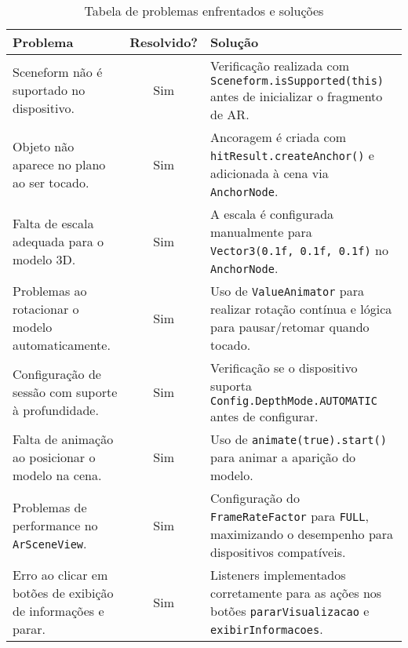 \documentclass[12pt]{article}
\begin{document}
\begin{table}[h!]
\centering
\begin{tabular}{|p{6cm}|c|p{6cm}|}
\hline
\textbf{Problema} & \textbf{Resolvido?} & \textbf{Solução} \\ \hline
Sceneform não é suportado no dispositivo. & Sim & Verificação realizada com \texttt{Sceneform.isSupported(this)} antes de inicializar o fragmento de AR. \\ \hline
Objeto não aparece no plano ao ser tocado. & Sim & Ancoragem é criada com \texttt{hitResult.createAnchor()} e adicionada à cena via \texttt{AnchorNode}. \\ \hline
Falta de escala adequada para o modelo 3D. & Sim & A escala é configurada manualmente para \texttt{Vector3(0.1f, 0.1f, 0.1f)} no \texttt{AnchorNode}. \\ \hline
Problemas ao rotacionar o modelo automaticamente. & Sim & Uso de \texttt{ValueAnimator} para realizar rotação contínua e lógica para pausar/retomar quando tocado. \\ \hline
Configuração de sessão com suporte à profundidade. & Sim & Verificação se o dispositivo suporta \texttt{Config.DepthMode.AUTOMATIC} antes de configurar. \\ \hline
Falta de animação ao posicionar o modelo na cena. & Sim & Uso de \texttt{animate(true).start()} para animar a aparição do modelo. \\ \hline
Problemas de performance no \texttt{ArSceneView}. & Sim & Configuração do \texttt{FrameRateFactor} para \texttt{FULL}, maximizando o desempenho para dispositivos compatíveis. \\ \hline
Erro ao clicar em botões de exibição de informações e parar. & Sim & Listeners implementados corretamente para as ações nos botões \texttt{pararVisualizacao} e \texttt{exibirInformacoes}. \\ \hline
\end{tabular}
\caption{Tabela de problemas enfrentados e soluções}
\label{tab:problemas_solucoes}
\end{table}
\end{document}
